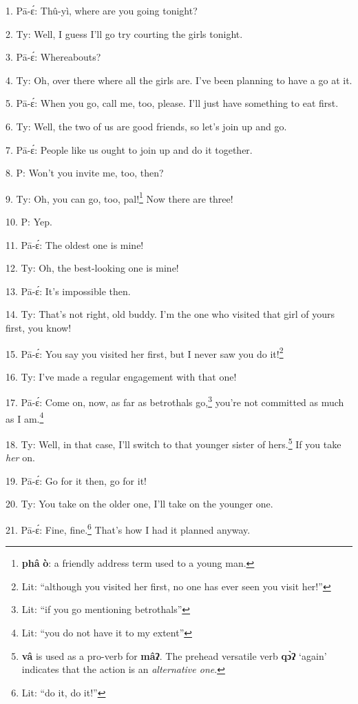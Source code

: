 \setcounter{footnote}{0}

1. Pā-ɛ́: Thû-yì, where are you going tonight?

2. Ty: Well, I guess I'll go try courting the girls tonight.

3. Pā-ɛ́: Whereabouts?

4. Ty: Oh, over there where all the girls are. I've been planning to have
a go at it.

5. Pā-ɛ́: When you go, call me, too, please. I'll just have something to eat
first.

6. Ty: Well, the two of us are good friends, so let's join up and go.

7. Pā-ɛ́: People like us ought to join up and do it together.

8. P: Won't you invite me, too, then?

9. Ty: Oh, you can go, too, pal!\footnote{\textbf{phâ} \textbf{ò}: a friendly address term used to a young man.} Now there are three!

10. P: Yep.

11. Pā-ɛ́: The oldest one is mine!

12. Ty: Oh, the best-looking one is mine!

13. Pā-ɛ́: It's impossible then.

14. Ty: That's not right, old buddy. I'm the one who visited that girl of
yours first, you know!

15. Pā-ɛ́: You say you visited her first, but I never saw you do it!\footnote{Lit: ``although you visited her first, no one has ever seen you visit her!''}

16. Ty: I've made a regular engagement with that one!

17. Pā-ɛ́: Come on, now, as far as betrothals go,\footnote{Lit: ``if you go mentioning betrothals''} you're not committed as
much as I am.\footnote{Lit: ``you do not have it to my extent''}

18. Ty: Well, in that case, I'll switch to that younger sister of hers.\footnote{\textbf{vâ} is used as a pro-verb for \textbf{mâʔ}. The prehead versatile verb \textbf{qɔ̀ʔ} `again' indicates that the action is an \textit{alternative one}.}
If you take \textit{her} on.

19. Pā-ɛ́: Go for it then, go for it!

20. Ty: You take on the older one, I'll take on the younger one.

21. Pā-ɛ́: Fine, fine.\footnote{Lit: ``do it, do it!''} That's how I had it planned anyway.

